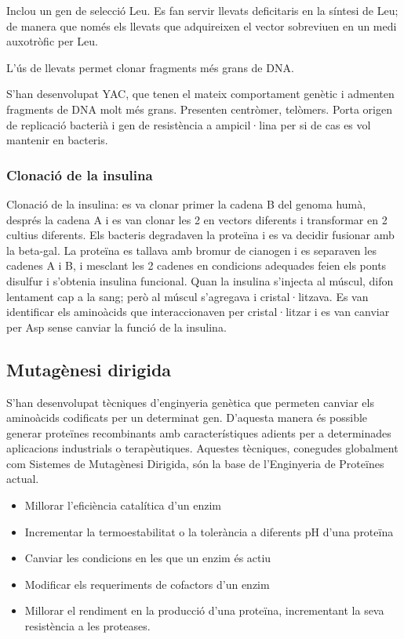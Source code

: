 Inclou un gen de selecció Leu. Es fan servir llevats deficitaris en la
síntesi de Leu; de manera que només els llevats que adquireixen el
vector sobreviuen en un medi auxotròfic per Leu.

L'ús de llevats permet clonar fragments més grans de DNA.

S'han desenvolupat YAC, que tenen el mateix comportament genètic i
admenten fragments de DNA molt més grans. Presenten centròmer,
telòmers. Porta origen de replicació bacterià i gen de resistència a
ampicil·lina per si de cas es vol mantenir en bacteris.

\subsubsection{Clonació de la insulina}
\label{sec:clonacio-de-la}

Clonació de la insulina: es va clonar primer la cadena B del genoma
humà, després la cadena A i es van clonar les 2 en vectors diferents i
transformar en 2 cultius diferents. Els bacteris degradaven la
proteïna i es va decidir fusionar amb la beta-gal. La proteïna es
tallava amb bromur de cianogen i es separaven les cadenes A i B, i
mesclant les 2 cadenes en condicions adequades feien els ponts
disulfur i s'obtenia insulina funcional. Quan la insulina s'injecta al
múscul, difon lentament cap a la sang; però al múscul s'agregava i
cristal·litzava. Es van identificar els aminoàcids que interaccionaven
per cristal·litzar i es van canviar per Asp sense canviar la funció de
la insulina.

\subsection{Mutagènesi dirigida}
\label{sec:mutagenesi-dirigida}

S'han desenvolupat tècniques d'enginyeria genètica que permeten
canviar els aminoàcids codificats per un determinat gen. D'aquesta
manera és possible generar proteïnes recombinants amb característiques
adients per a determinades aplicacions industrials o
terapèutiques. Aquestes tècniques, conegudes globalment com Sistemes
de Mutagènesi Dirigida, són la base de l'Enginyeria de Proteïnes
actual.

\begin{itemize}
\item Millorar l'eficiència catalítica d'un enzim
\item Incrementar la termoestabilitat o la tolerància a diferents pH
  d'una proteïna
\item Canviar les condicions en les que un enzim és actiu
\item Modificar els requeriments de cofactors d'un enzim
\item Millorar el rendiment en la producció d'una proteïna,
  incrementant la seva resistència a les proteases.
\end{itemize}

